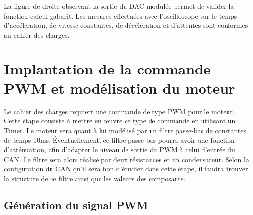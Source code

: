 \documentclass[a4paper]{article}
\begin{document}
La figure de droite observant la sortie du DAC modulée permet de valider la fonction calcul gabarit. Les mesures effectuées avec l'oscilloscope sur le temps d'accélération, de vitesse constantes, de décélération et d'attentes sont conformes au cahier des charges. 

\newpage
\section{Implantation de la commande PWM et modélisation du moteur}
	Le cahier des charges requiert une commande de type PWM pour le moteur. Cette étape consiste à mettre en œuvre ce type de commande en utilisant un Timer. Le moteur sera quant à lui modélisé par un filtre passe-bas de constantes de temps 10ms. Éventuellement, ce filtre passe-bas pourra avoir une fonction d’atténuation, afin d’adapter le niveau de sortie du PWM à celui d'entrée du CAN. Le filtre sera alors réalisé par deux résistances et un condensateur. Selon la configuration du CAN qu’il sera bon d’étudier dans cette étape, il faudra trouver la structure de ce filtre ainsi que les valeurs des composants. 
	
\subsection{Génération du signal PWM}
\end{document}
